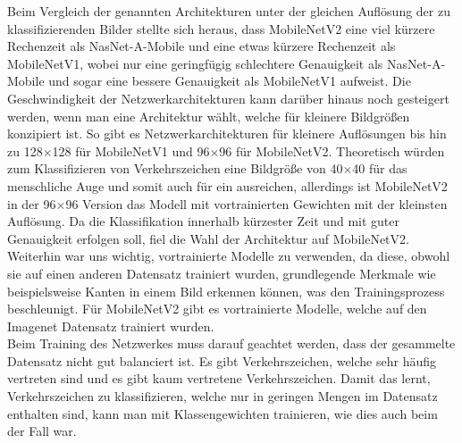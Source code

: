 \documentclass[12pt,a4paper,ngerman,enabledeprecatedfontcommands]{scrreprt}
\begin{document}
Beim Vergleich der genannten Architekturen unter der gleichen Auflösung der zu klassifizierenden Bilder stellte sich heraus, dass MobileNetV2\cite{DBLP:journals/corr/abs-1801-04381} eine viel kürzere Rechenzeit als NasNet-A-Mobile und eine etwas kürzere Rechenzeit als MobileNetV1\cite{DBLP:journals/corr/HowardZCKWWAA17}, wobei nur eine geringfügig schlechtere Genauigkeit als NasNet-A-Mobile und sogar eine bessere Genauigkeit als MobileNetV1\cite{DBLP:journals/corr/HowardZCKWWAA17} aufweist.
Die Geschwindigkeit der Netzwerkarchitekturen kann darüber hinaus noch gesteigert werden, wenn man eine Architektur wählt, welche für kleinere Bildgrößen konzipiert ist. 
So gibt es Netzwerkarchitekturen für kleinere Auflösungen bis hin zu 128$\times$128 für MobileNetV1\cite{DBLP:journals/corr/HowardZCKWWAA17} und 96$\times$96 für MobileNetV2\cite{DBLP:journals/corr/abs-1801-04381}.
Theoretisch würden zum Klassifizieren von Verkehrszeichen eine Bildgröße von 40$\times$40 für das menschliche Auge und somit auch für ein  ausreichen, allerdings ist MobileNetV2\cite{DBLP:journals/corr/abs-1801-04381} in der 96$\times$96 Version das Modell mit vortrainierten Gewichten mit der kleinsten Auflösung.
Da die Klassifikation innerhalb kürzester Zeit und mit guter Genauigkeit erfolgen soll, fiel die Wahl der Architektur auf MobileNetV2\cite{DBLP:journals/corr/abs-1801-04381}.\\
Weiterhin war uns wichtig, vortrainierte Modelle zu verwenden, da diese, obwohl sie auf einen anderen Datensatz trainiert wurden, grundlegende Merkmale wie beispielsweise Kanten in einem Bild erkennen können, was den Trainingsprozess beschleunigt. Für MobileNetV2\cite{DBLP:journals/corr/abs-1801-04381} gibt es vortrainierte Modelle, welche auf den Imagenet Datensatz trainiert wurden.\\
Beim Training des Netzwerkes muss darauf geachtet werden, dass der gesammelte Datensatz nicht gut balanciert ist. Es gibt Verkehrszeichen, welche sehr häufig vertreten sind und es gibt kaum vertretene Verkehrszeichen.
Damit das  lernt, Verkehrszeichen zu klassifizieren, welche nur in geringen Mengen im Datensatz enthalten sind, kann man mit Klassengewichten trainieren, wie dies auch beim  der Fall war.\\
\end{document}
